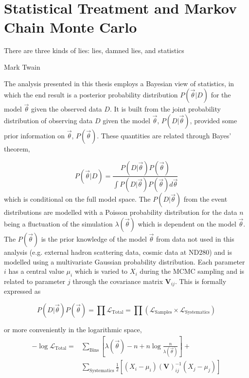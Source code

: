 \chapter{Statistical Treatment and Markov Chain Monte Carlo}
\label{chap:mcmc}

\epigraph{There are three kinds of lies: lies, damned lies, and statistics}{Mark Twain}

The analysis presented in this thesis employs a Bayesian view of statistics, in which the end result is a posterior probability distribution $P(\vec{\theta}|D)$ for the model $\vec{\theta}$ given the observed data $D$. It is built from the joint probability distribution of observing data $D$ given the model $\vec{\theta}$, $P(D|\vec{\theta})$, provided some prior information on $\vec{\theta}$, $P(\vec{\theta})$. These quantities are related through Bayes' theorem,

\begin{equation}
P(\vec{\theta}|D) = \frac{P(D|\vec{\theta})P(\vec{\theta})}{\int P(D|\vec{\theta})P(\vec{\theta})d\vec{\theta}}
\label{eq:bayes}
\end{equation}
which is conditional on the full model space. The $P(D|\vec{\theta})$ from the event distributions are modelled with a Poisson probability distribution for the data $n$ being a fluctuation of the simulation $\lambda(\vec{\theta})$ which is dependent on the model $\vec{\theta}$. The $P(\vec{\theta})$ is the prior knowledge of the model $\vec{\theta}$ from data not used in this analysis (e.g. external hadron scattering data, cosmic data at ND280) and is modelled using a multivariate Gaussian probability distribution. Each parameter $i$ has a central value $\mu_i$ which is varied to $X_i$ during the MCMC sampling and is related to parameter $j$ through the covariance matrix $\mathbf{V}_{ij}$. This is formally expressed as

\begin{equation}
	P(D|\vec{\theta}) P(\vec{\theta}) = \prod \mathcal{L}_\text{Total} = \prod \left(\mathcal{L}_\text{Samples} \times \mathcal{L}_\text{Systematics}\right)
\end{equation}

or more conveniently in the logarithmic space,
\begin{equation}
\label{eq:test_stat}
\begin{split}
	- \log\mathcal{L}_\text{Total} = &\sum_\text{Bins} \left[ \lambda(\vec{\theta}) - n + n \log \frac{n}{\lambda(\vec{\theta})} \right] + \\
									& \sum_\text{Systematics} \frac{1}{2} \left[ ( X_i - \mu_i ) \left( \boldsymbol{V} \right)^{-1}_{ij} ( X_j - \mu_j ) \right]
\end{split}
\end{equation}

